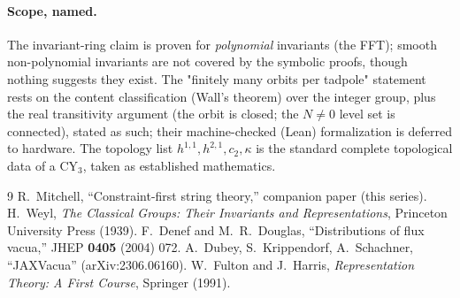 \documentclass[11pt]{article}
\begin{document}
\paragraph{Scope, named.} The invariant-ring claim is proven for \emph{polynomial}
invariants (the FFT); smooth non-polynomial invariants are not covered by the
symbolic proofs, though nothing suggests they exist. The "finitely many orbits per
tadpole" statement rests on the content classification (Wall's theorem) over the
integer group, plus the real transitivity argument (the orbit is closed; the $N\neq0$
level set is connected), stated as such; their machine-checked (Lean) formalization is
deferred to hardware. The
topology list $h^{1,1},h^{2,1},c_2,\kappa$ is the standard complete topological data
of a $\mathrm{CY}_3$, taken as established mathematics.

\begin{thebibliography}{9}
 R.~Mitchell, ``Constraint-first string theory,'' companion paper (this series).
 H.~Weyl, \emph{The Classical Groups: Their Invariants and Representations}, Princeton University Press (1939).
 F.~Denef and M.~R.~Douglas, ``Distributions of flux vacua,'' JHEP \textbf{0405} (2004) 072.
 A.~Dubey, S.~Krippendorf, A.~Schachner, ``JAXVacua'' (arXiv:2306.06160).
 W.~Fulton and J.~Harris, \emph{Representation Theory: A First Course}, Springer (1991).
\end{thebibliography}
\end{document}
